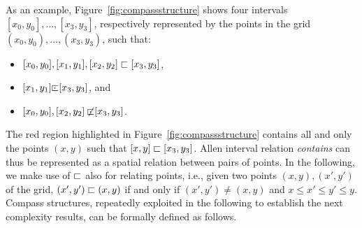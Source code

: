 As an example, Figure~\ref{fig:compassstructure} shows four intervals
$[x_0,y_0],\ldots,[x_3,y_3]$, respectively represented by the points in the grid $(x_0,y_0),\ldots,(x_3,y_3)$, such that: 
\begin{itemize}
    \item $[x_0,y_0], [x_1,y_1], [x_2,y_2]\sqsubset [x_3,y_3]$, 
    \item $[x_1,y_1] \ssubint [x_3,y_3]$, and 
    \item $[x_0,y_0], [x_2,y_2]\not\!\!\ssubint [x_3,y_3]$. 
\end{itemize}
The red 
region highlighted in Figure~\ref{fig:compassstructure} contains all and only the points $(x,y)$ such that $[x,y]\sqsubset[x_3,y_3]$.
Allen interval relation \emph{contains} can thus be represented as a spatial relation between pairs of points. In the following, we make use of $\sqsubset$ also for relating points, i.e., given two points $(x,y),(x',y')$ of the grid,
$(x',y')\sqsubset (x,y)$ if and only if $(x',y')\neq (x,y)$ and  $x\leq x'\leq y'\leq y$.
%
Compass structures, repeatedly exploited in the following to establish the next complexity results, %
can be formally defined as follows.

